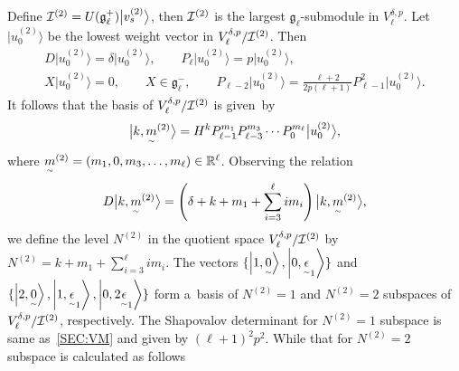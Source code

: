 \documentclass[11pt]{article}
\numberwithin{equation}{section}
\newcommand{\underaccent}[2]{\mathord{\underset{\smash{\scriptscriptstyle\sim}}{#2}}}
\def\ket#1{\left| #1\right\rangle}
\begin{document}
Def\/ine $ {\cal I}^{(2)} = U({\mathfrak g}_{\ell}^{+}) \big|v_s^{(2)}\big\rangle $, then $ {\cal I}^{(2)} $ is the largest $
{\mathfrak g}_{\ell}$-submodule in $ V^{\delta,p}_{\ell}$.
Let $ \big|u_0^{(2)}\big\rangle  $ be the lowest weight vector in $ V^{\delta,p}_{\ell}/{\cal I}^{(2)}$.
Then
\begin{gather*}
    D \big|u_0^{(2)}\big\rangle  = \delta \big|u_0^{(2)}\big\rangle ,
\qquad
P_{\ell} \big|u_0^{(2)}\big\rangle  = p \big|u_0^{(2)}\big\rangle ,
\nonumber
\\
    X \big|u_0^{(2)}\big\rangle  = 0, \qquad X \in {\mathfrak g}_{\ell}^-,
\qquad
P_{\ell-2} \big|u_0^{(2)}\big\rangle  = \frac{\ell+2}{2p (\ell+1)} P_{\ell-1}^2 \big|u_0^{(2)}\big\rangle .
\end{gather*}
It follows that the basis of $ V^{\delta,p}_{\ell}/{\cal I}^{(2)} $ is given~by
\begin{gather*}
\big|k,\underaccent{\tilde}{m}^{(2)}\big\rangle  = H^k   P_{\ell-1}^{m_1}  P_{\ell-3}^{m_3} \cdots P_{0}^{m_{\ell}}
\big|u_0^{(2)}\big\rangle ,
\end{gather*}
where $ \underaccent{\tilde}{m}^{(2)} = (m_1, 0, m_3, \dots,m_{\ell}) \in {\mathbb R}^{\ell}$.
Observing the relation
\begin{gather*}
D \big|k,\underaccent{\tilde}{m}^{(2)}\big\rangle  = \left(\delta+k +m_1 + \sum\limits_{i=3}^{\ell}i m_i\right)
\big|k,\underaccent{\tilde}{m}^{(2)}\big\rangle ,
\end{gather*}
we def\/ine the level $ N^{(2)} $ in the quotient space $ V^{\delta,p}_{\ell}/{\cal I}^{(2)} $ by $  N^{(2)}
= k + m_1 + \sum\limits_{i=3}^{\ell} i m_{i}$.
The vectors $ \{
\ket{1,\underaccent{\tilde}{0}},
\ket{0,\underaccent{\tilde}{\epsilon}_1}
\} $ and $ \{
\ket{2,\underaccent{\tilde}{0}},
\ket{1,\underaccent{\tilde}{\epsilon}_1},
\ket{0,2\underaccent{\tilde}{\epsilon}_1}
\}$ form a~basis of $ N^{(2)} = 1 $ and $ N^{(2)} = 2 $ subspaces of $ V^{\delta,p}_{\ell}/{\cal I}^{(2)}$,
respectively.
The Shapovalov determinant for $ N^{(2)} = 1 $ subspace is same as~\eqref{SEC:VM} and given by $ (\ell+1)^2 p^2$.
While that for $ N^{(2)} = 2 $ subspace is calculated as follows
\end{document}
